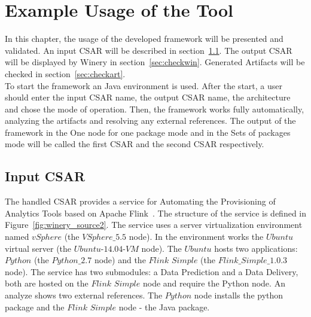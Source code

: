 
\chapter{Example Usage of the Tool}\label{chap:check}
In this chapter, the usage of the developed framework will be presented and validated.
An input CSAR will be described in section~\ref{sec:inputcsar}.
The output CSAR will be displayed by Winery in section~\ref{sec:checkwin}.
Generated Artifacts will be checked in section~\ref{sec:checkart}.\\
To start the framework an Java environment is used.
After the start, a user should enter the input CSAR name, the output CSAR name, the architecture and chose the mode of operation.
Then, the framework works fully automatically, analyzing the artifacts and resolving any external references.
The output of the framework in the One node for one package mode and in the Sets of packages mode will be called the first CSAR and the second CSAR respectively.

\section{Input CSAR}\label{sec:inputcsar}
The handled CSAR provides a service for Automating the Provisioning of Analytics Tools based on Apache Flink~\cite{csar_test}.
The structure of the service is defined in Figure~\ref{fig:winery_source2}. 
The service uses a server virtualization environment named $vSphere$ (the $VSphere\_5.5$ node). 
In the environment works the $Ubuntu$ virtual server (the $Ubuntu$-$14.04$-$VM$ node).
The $Ubuntu$ hosts two applications: $Python$ (the $Python\_2.7$ node) and the $Flink$ $Simple$ (the $Flink\_Simple\_1.0.3$ node).
The service has two submodules: a Data Prediction and a Data Delivery, both are hosted on the $Flink$ $Simple$ node and require the Python node. 
An analyze shows two external references. The $Python$ node installs the python package and the $Flink$ $Simple$ node - the Java package. 
